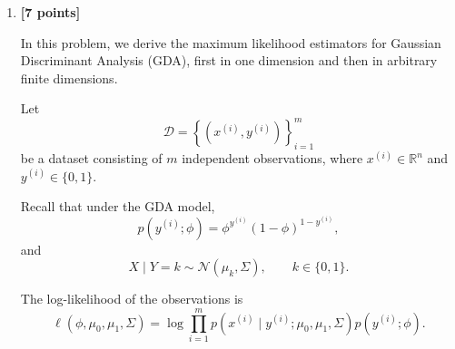 \documentclass[10pt]{article}
\begin{document}
\begin{enumerate}
\begin{enumerate}[label=(\alph*)]
Using the symmetry of $\Omega$, we have
\[
\mu_i^T\Omega x=x^T\Omega\mu_i.
\]

Hence,
\[
\begin{aligned}
& (x-\mu_0)^T\Omega(x-\mu_0)
-(x-\mu_1)^T\Omega(x-\mu_1)
\\[4pt]
={}&
2x^T\Omega(\mu_1-\mu_0)
+\mu_0^T\Omega\mu_0
-\mu_1^T\Omega\mu_1.
\end{aligned}
\]

Substituting this expression back into the posterior,
\[
\begin{aligned}
p(y=1\mid x)
=
\frac{1}{
1+\dfrac{1-\phi}{\phi}
\exp\left(
-x^T\Omega(\mu_1-\mu_0)
-\frac12\mu_0^T\Omega\mu_0
+\frac12\mu_1^T\Omega\mu_1
\right)
}.
\end{aligned}
\]

Since
\[
\frac{1-\phi}{\phi}
=
\exp\left(-\log\frac{\phi}{1-\phi}\right),
\]
we may rewrite the posterior as
\[
p(y=1\mid x)
=
\frac{1}{
1+\exp\left(
-\left[
x^T\Omega(\mu_1-\mu_0)
+\frac12\mu_0^T\Omega\mu_0
-\frac12\mu_1^T\Omega\mu_1
+\log\frac{\phi}{1-\phi}
\right]
\right)
}.
\]

Therefore, defining
\[
\boxed{
\theta=\Sigma^{-1}(\mu_1-\mu_0)
}
\]
and by using the differnece-of-squares identity:
\[
\boxed{
\theta_0
=
\frac12\mu_0^T\Sigma^{-1}\mu_0
-\frac12\mu_1^T\Sigma^{-1}\mu_1
+\log\frac{\phi}{1-\phi},
    = \log\frac{\phi}{1-\phi} - \frac{1}{2}(\mu_0 + \mu_1)^{T} \theta}
\]
we conclude that
\[
\boxed{
p(y=1\mid x)
=
\frac{1}{1+\exp(-(\theta^Tx+\theta_0))}.
}
\]

\hfill$\square$

\item \textbf{[7 points]}

In this problem, we derive the maximum likelihood estimators
for Gaussian Discriminant Analysis (GDA), first in one
dimension and then in arbitrary finite dimensions.

Let
\[
\mathcal{D}
=
\left\{(x^{(i)},y^{(i)})\right\}_{i=1}^{m}
\]
be a dataset consisting of $m$ independent observations,
where $x^{(i)}\in\mathbb{R}^{n}$ and $y^{(i)}\in\{0,1\}$.

Recall that under the GDA model,
\[
p(y^{(i)};\phi)
=
\phi^{y^{(i)}}(1-\phi)^{1-y^{(i)}},
\]
and
\[
X\mid Y=k
\sim
\mathcal{N}(\mu_k,\Sigma),
\qquad k\in\{0,1\}.
\]

The log-likelihood of the observations is
\[
\ell(\phi,\mu_0,\mu_1,\Sigma)
=
\log
\prod_{i=1}^{m}
p(x^{(i)}\mid y^{(i)};\mu_0,\mu_1,\Sigma)
p(y^{(i)};\phi).
\]


\end{enumerate}
\end{enumerate}
\end{document}
